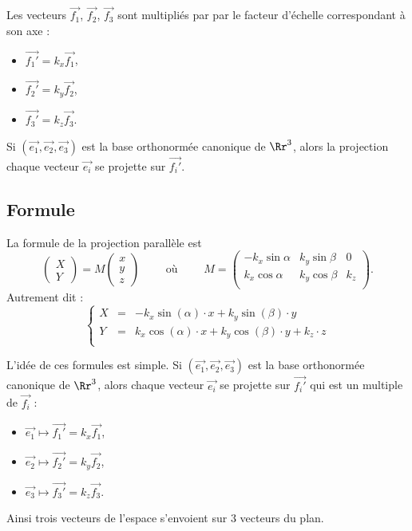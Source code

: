 \documentclass[11pt,class=report,crop=false]{standalone}
\begin{document}
Les vecteurs $\vec {f_1}$, $\vec {f_2}$, $\vec {f_3}$ sont multipliés par par le facteur d'échelle correspondant à son axe :
\begin{itemize}
	\item $\vec {f_1'} = k_x \vec {f_1}$,
	\item $\vec {f_2'} = k_y \vec {f_2}$,
	\item $\vec {f_3'} = k_z \vec {f_3}$.		
\end{itemize}


 
Si $(\vec{e_1},\vec{e_2},\vec{e_3})$ est la base orthonormée canonique de $\Rr^3$, alors la projection chaque vecteur $\vec{e_i}$ se projette sur $\vec {f_i'}$.



\subsection{Formule}

\begin{proposition}
La formule de la projection parallèle est 
$$\begin{pmatrix}X\\Y\end{pmatrix} = M \begin{pmatrix}x\\y\\z\end{pmatrix}
\qquad \text{ où } \qquad 
M = \begin{pmatrix}
-k_x\sin\alpha & k_y\sin\beta & 0\\
k_x\cos\alpha  & k_y\cos\beta & k_z\\
\end{pmatrix}.
$$
Autrement dit :
$$\left\{
\begin{array}{rcl}
X &=&  -k_x\sin(\alpha) \cdot x + k_y\sin(\beta) \cdot y \\
Y &=&  k_x\cos(\alpha) \cdot x + k_y\cos(\beta) \cdot y + k_z \cdot z \\
\end{array}
\right.$$
\end{proposition}


L'idée de ces formules est simple. Si $(\vec{e_1},\vec{e_2},\vec{e_3})$ est la base orthonormée canonique de $\Rr^3$, alors chaque vecteur $\vec{e_i}$ se projette sur $\vec {f_i'}$ qui est un multiple de $\vec{f_i}$ :
\begin{itemize}
  \item $\vec {e_1} \mapsto \vec {f_1'} = k_x \vec {f_1}$,
  \item $\vec {e_2} \mapsto \vec {f_2'} = k_y \vec {f_2}$,
  \item $\vec {e_3} \mapsto \vec {f_3'} = k_z \vec {f_3}$.
\end{itemize}
Ainsi trois vecteurs de l'espace s'envoient sur $3$ vecteurs du plan.
\end{document}
